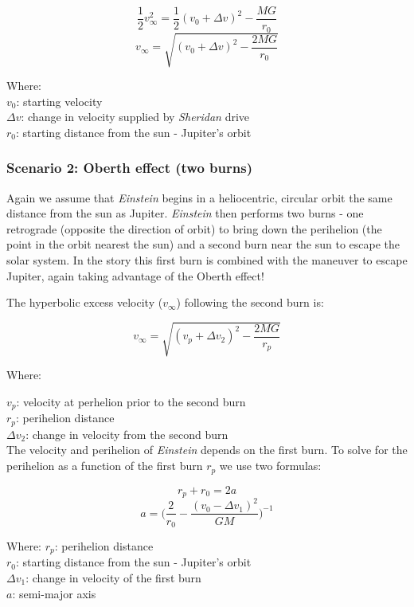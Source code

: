\documentclass[12pt]{article} %
\begin{document}
$$\frac{1}{2}v_{\infty}^{2} = \frac{1}{2} (v_0 + \Delta v)^2 - \frac{MG}{r_0}$$
$$v_{\infty} = \sqrt{(v_0 + \Delta v)^2-\frac{2MG}{r_0}}$$

Where:\\

$v_0$: starting velocity\\
$\Delta v$: change in velocity supplied by \textit{Sheridan} drive\\
$r_0$: starting distance from the sun - Jupiter's orbit

\subsubsection{Scenario 2: Oberth effect (two burns)}

Again we assume that \textit{Einstein} begins in a heliocentric, circular orbit the same distance from the sun as Jupiter. \textit{Einstein} then performs two burns - one retrograde (opposite the direction of orbit) to bring down the perihelion (the point in the orbit nearest the sun) and a second burn near the sun to escape the solar system. In the story this first burn is combined with the maneuver to escape Jupiter, again taking advantage of the Oberth effect!

The hyperbolic excess velocity ($ v_{\infty}$) following the second burn is:

$$v_{\infty} = \sqrt{(v_p + \Delta v_2)^2-\frac{2MG}{r_p}}$$

Where:

$v_p$: velocity at perhelion prior to the second burn\\
$r_p$: perihelion distance\\
$\Delta v_2$: change in velocity from the second burn\\

The velocity and perihelion of \textit{Einstein} depends on the first burn. To solve for the perihelion as a function of the first burn $r_p$ we use two formulas:

$$r_p + r_0 = 2a$$
$$a = \bigg(\frac{2}{r_0} - \frac{(v_0-\Delta v_1)^2}{GM}\bigg)^{-1}$$

Where:
$r_p$: perihelion distance\\
$r_0$: starting distance from the sun - Jupiter's orbit\\
$\Delta v_1$: change in velocity of the first burn\\
$a$: semi-major axis\\
\end{document}
